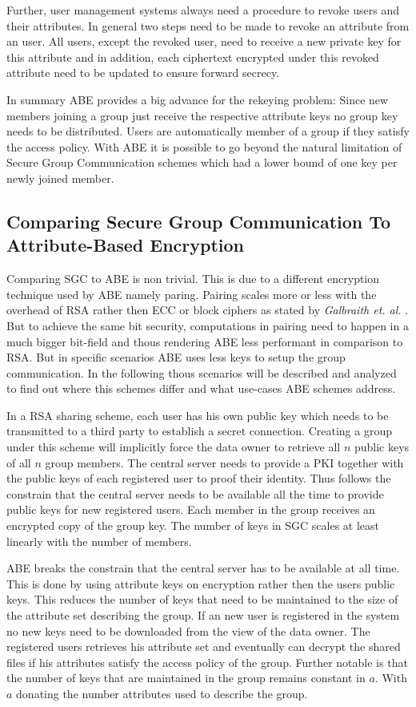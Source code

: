 Further, user management systems always need a procedure to revoke users and their attributes. 
In general two steps need to be made to revoke an attribute from an user. All users, except the revoked user, need to receive a new private key for this attribute and in addition, each ciphertext encrypted under this revoked attribute need to be updated to ensure forward secrecy. 

In summary ABE provides a big advance for the rekeying problem: Since new members joining a group just receive the respective attribute keys no group key needs to be distributed. Users are automatically member of a group if they satisfy the access policy. With \ac{ABE} it is possible to go beyond the natural limitation of Secure Group Communication schemes which had a lower bound of one key per newly joined member.  

\subsection{Comparing Secure Group Communication To Attribute-Based Encryption}
Comparing \ac{SGC} to \ac{ABE} is non trivial. This is due to a different encryption technique used by \ac{ABE} namely paring. Pairing scales more or less with the overhead of \ac{RSA} rather then \ac{ECC} or block ciphers as stated by \textit{Galbraith et. al.} \cite{galbraith2008pairings}. But to achieve the same bit security, computations in pairing need to happen in a much bigger bit-field and thous rendering \ac{ABE} less performant in comparison to \ac{RSA}. But in specific scenarios \ac{ABE} uses less keys to setup the group communication. In the following thous scenarios will be described and analyzed to find out where this schemes differ and what use-cases \ac{ABE} schemes address.

In a \ac{RSA} sharing scheme, each user has his own public key which needs to be transmitted to a third party to establish a secret connection. Creating a group under this scheme will implicitly force the data owner to retrieve all $n$ public keys of all $n$ group members. The central server needs to provide a \ac{PKI} together with the public keys of each registered user to proof their identity. Thus follows the constrain that the central server needs to be available all the time to provide public keys for new registered users. Each member in the group receives an encrypted copy of the group key. The number of keys in \ac{SGC} scales at least linearly with the number of members. 

\ac{ABE} breaks the constrain that the central server has to be available at all time. This is done by using attribute keys on encryption rather then the users public keys. This reduces the number of keys that need to be maintained to the size of the attribute set describing the group. If an new user is registered in the system no new keys need to be downloaded from the view of the data owner. The registered users retrieves his attribute set and eventually can decrypt the shared files if his attributes satisfy the access policy of the group. Further notable is that the number of keys that are maintained in the group remains constant in $a$. With $a$ donating the number attributes used to describe the group. 

